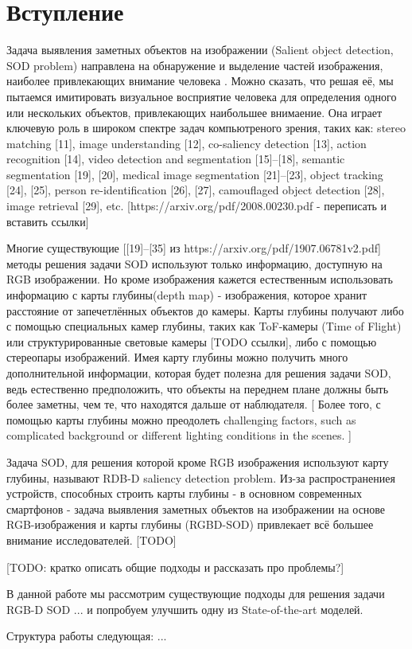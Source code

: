 \section{Вступление}

Задача выявления заметных объектов на изображении (Salient object detection, SOD problem) направлена на обнаружение и выделение частей изображения, наиболее привлекающих внимание
человека \cite{Is-Depth-Really-Necessary-for-SOD}. Можно сказать, что решая её, мы пытаемся имитировать визуальное восприятие человека для определения одного 
или нескольких объектов, привлекающих наибольшее внимаение. Она играет ключевую роль в широком спектре задач компьютреного зрения, таких как:
stereo matching [11], image understanding [12], co-saliency detection [13], action recognition [14], video detection and
segmentation [15]–[18], semantic segmentation [19], [20],
medical image segmentation [21]–[23], object tracking [24],
[25], person re-identification [26], [27], camouflaged object
detection [28], image retrieval [29], etc. [https://arxiv.org/pdf/2008.00230.pdf - переписать и вставить ссылки]

Многие существующие [[19]–[35] из https://arxiv.org/pdf/1907.06781v2.pdf] методы решения задачи SOD используют только информацию, доступную на RGB изображении.
Но кроме изображения кажется естественным использовать информацию с карты глубины(depth map) - изображения, которое хранит расстояние от запечетлённых объектов до камеры.
Карты глубины получают либо с помощью специальных камер глубины, таких как ToF-камеры (Time of Flight) или структурированные световые камеры [TODO ссылки], либо с помощью
стереопары изображений. Имея карту глубины можно получить много дополнительной информации, которая будет полезна для решения задачи SOD, ведь естественно предположить, что объекты на переднем плане должны быть более заметны, 
чем те, что находятся дальше от наблюдателя. [ Более того, с помощью карты глубины можно преодолеть challenging factors, such as complicated
background or different lighting conditions in the scenes. ]

Задача SOD, для решения которой кроме RGB изображения используют карту глубины, называют RDB-D saliency detection problem.
Из-за распространениея устройств, способных строить карты глубины - в основном современных смартфонов - задача выявления заметных объектов на изображении на основе RGB-изображения и карты глубины (RGBD-SOD) привлекает всё большее внимание исследователей. [TODO]

[TODO: кратко описать общие подходы и рассказать про проблемы?]

В данной работе мы рассмотрим существующие подходы для решения задачи RGB-D SOD ... и попробуем улучшить одну из State-of-the-art моделей.

Структура работы следующая:  ...